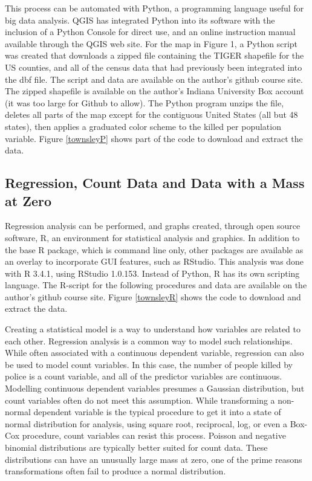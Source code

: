 \documentclass[sigconf]{acmart}
\begin{document}
This process can be automated with Python, a programming language useful for big data analysis. \cite{python}  QGIS has integrated Python into its software with the inclusion of a Python Console for direct use, and an online instruction manual available through the QGIS web site. \cite{pyqgis}  For the map in Figure 1, a Python script was created that downloads a zipped file containing the TIGER shapefile for the US counties, and all of the census data that had previously been integrated into the dbf file. The script and data are available on the author's github course site. \cite{townsleyP} The zipped shapefile is available on the author's Indiana University Box account (it was too large for Github to allow). \cite{townsley2} The Python program unzips the file, deletes all parts of the map except for the contiguous United States (all but 48 states), then applies a graduated color scheme to the killed per population variable.  Figure \ref{townsleyP} shows part of the code to download and extract the data.

\subsection{Regression, Count Data and Data with a Mass at Zero}
Regression analysis can be performed, and graphs created, through open source software, R, an environment for statistical analysis and graphics. \cite{r}  In addition to the base R package, which is command line only, other packages are available as an overlay to incorporate GUI features, such as RStudio. \cite{rstudio}  This analysis was done with R 3.4.1, using RStudio 1.0.153.  Instead of Python, R has its own scripting language.  The R-script for the following procedures and data are available on the author's github course site. \cite{townsleyR} Figure \ref{townsleyR} shows the code to download and extract the data.

Creating a statistical model is a way to understand how variables are related to each other.  Regression analysis is a common way to model such relationships.  While often associated with a continuous dependent variable, regression can also be used to model count variables. \cite{kaminski05} In this case, the number of people killed by police is a count variable, and all of the predictor variables are continuous.  Modelling continuous dependent variables presumes a Gaussian distribution, but count variables often do not meet this assumption. \cite{fox15} While transforming a non-normal dependent variable is the typical procedure to get it into a state of normal distribution for analysis, using square root, reciprocal, log, or even a Box-Cox procedure, count variables can resist this process.  Poisson and negative binomial distributions are typically better suited for count data. \cite{martin17} These distributions can have an unusually large mass at zero, one of the prime reasons transformations often fail to produce a normal distribution. \cite{farewell17,beaujean16,gamlss,fox15,neelon16} 
\end{document}
